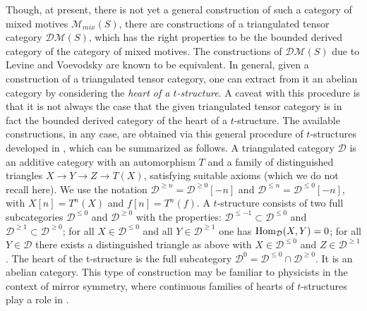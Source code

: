 \documentclass[10pt]{amsart}
\def\cD{{\mathcal D}}
\def\M{{\mathcal M}}
\def\Hom{\mathop{\rm Hom}\nolimits}
\numberwithin{equation}{section}
\begin{document}
Though, at present, there is not yet a general construction of
such a category of mixed motives $\M_{mix}(S)$, there are constructions
of a triangulated tensor category $\cD\M(S)$, which has the right
properties to be the bounded derived category of the category
of mixed motives. The constructions of $\cD\M(S)$ due
to Levine \cite{Le} and Voevodsky \cite{Vo} are known to be
equivalent. In general, given a construction of a triangulated tensor
category, one can extract from it an abelian category by considering
the {\em heart of a $t$-structure}. A caveat with this procedure is
that it is not always the case that the given triangulated tensor
category is in fact the bounded derived category of the heart of a
$t$-structure. The available constructions, in any case, are obtained
via this general procedure of $t$-structures developed in \cite{BBD},
which can be summarized as follows.
A triangulated category ${\mathcal D}$ is an additive category
with an automorphism $T$ and a family of distinguished
triangles $X \to Y \to Z \to T(X)$, satisfying suitable axioms (which
we do not recall here). We use the notation
${\mathcal D}^{\geq n} = {\mathcal D}^{\geq 0}[-n]$ and
${\mathcal D}^{\leq n} = {\mathcal D}^{\leq 0}[-n]$, with
$X[n]=T^n(X)$ and $f[n]=T^n(f)$.
A $t$-structure consists of two full subcategories
${\mathcal D}^{\leq 0}$ and ${\mathcal D}^{\geq 0}$ with the properties:
${\mathcal D}^{\leq -1} \subset {\mathcal D}^{\leq 0}$ and
${\mathcal D}^{\geq 1} \subset {\mathcal D}^{\geq 0}$; for all
$X\in {\mathcal D}^{\leq 0}$ and all $Y\in {\mathcal D}^{\geq 1}$ one has
$\Hom_{\mathcal D} (X,Y)=0$; for all $Y\in {\mathcal D}$ there exists a
distinguished triangle as above with $X\in {\mathcal D}^{\leq 0}$
and $Z\in {\mathcal D}^{\geq 1}$.
The heart of the t-structure is the
full subcategory ${\mathcal D}^0= {\mathcal D}^{\leq 0}\cap
{\mathcal D}^{\geq 0}$. It is an abelian category. This type of
construction may be familiar to physicists in the context of mirror
symmetry, where continuous families of hearts of $t$-structures play a
role in \cite{Dou}.

\smallskip
\end{document}

